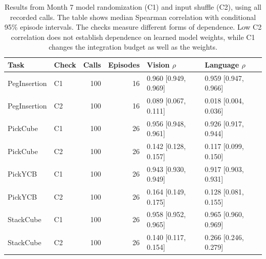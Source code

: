 \begin{table}[htbp]
\centering\small
\setlength{\tabcolsep}{3.5pt}
\caption{Results from Month 7 model randomization (C1) and input shuffle (C2), using all recorded calls. The table shows median Spearman correlation with conditional 95\% episode intervals. The checks measure different forms of dependence. Low C2 correlation does not establish dependence on learned model weights, while C1 changes the integration budget as well as the weights.}
\label{tab:sanity}
\begin{tabular}{llrrll}
\toprule
Task & Check & Calls & Episodes & Vision $\rho$ & Language $\rho$ \\
\midrule
PegInsertion & C1 & 100 & 16 & 0.960 [0.949, 0.969] & 0.959 [0.947, 0.966] \\
PegInsertion & C2 & 100 & 16 & 0.089 [0.067, 0.111] & 0.018 [0.004, 0.036] \\
PickCube & C1 & 100 & 26 & 0.956 [0.948, 0.961] & 0.926 [0.917, 0.944] \\
PickCube & C2 & 100 & 26 & 0.142 [0.128, 0.157] & 0.117 [0.099, 0.150] \\
PickYCB & C1 & 100 & 26 & 0.943 [0.930, 0.949] & 0.917 [0.903, 0.931] \\
PickYCB & C2 & 100 & 26 & 0.164 [0.149, 0.175] & 0.128 [0.081, 0.155] \\
StackCube & C1 & 100 & 26 & 0.958 [0.952, 0.965] & 0.965 [0.960, 0.969] \\
StackCube & C2 & 100 & 26 & 0.140 [0.117, 0.154] & 0.266 [0.246, 0.279] \\
\bottomrule
\end{tabular}
\end{table}
